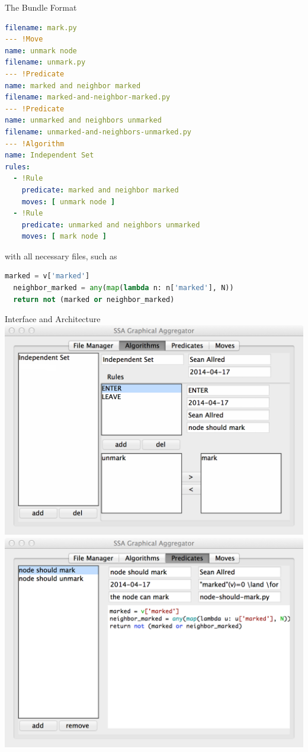 \documentclass{beamer}
\begin{document}
\begin{frame}[fragile,t]
\begin{columns}[t]
\begin{column}{.45\textwidth}
\begin{block}{The Bundle Format}
\begin{lstlisting}[language=yaml,basicstyle=\ttfamily\YAMLkeystyle]
filename: mark.py
--- !Move
name: unmark node
filename: unmark.py
--- !Predicate
name: marked and neighbor marked
filename: marked-and-neighbor-marked.py
--- !Predicate
name: unmarked and neighbors unmarked
filename: unmarked-and-neighbors-unmarked.py
--- !Algorithm
name: Independent Set
rules:
  - !Rule
    predicate: marked and neighbor marked
    moves: [ unmark node ]
  - !Rule
    predicate: unmarked and neighbors unmarked
    moves: [ mark node ]
\end{lstlisting}
          with all necessary files, such as 
\vspace{.3in}
\begin{lstlisting}[language=Python,stringstyle=\color{green!50!black},keywordstyle=\color{blue}]
  marked = v['marked']
  neighbor_marked = any(map(lambda n: n['marked'], N))
  return not (marked or neighbor_marked)
\end{lstlisting}
      \end{block}

      \begin{block}{Interface and Architecture}
        \includegraphics[width=.49\linewidth]{../figs/4}
        \hfill
        \includegraphics[width=.49\linewidth]{../figs/2}


\end{block}
\end{column}
\end{columns}
\end{frame}
\end{document}
